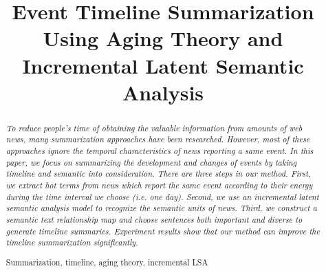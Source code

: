 \documentclass[runningheads,a4paper]{llncs}
\newcommand{\keywords}[1]{\par\addvspace\baselineskip
\noindent\keywordname\enspace\ignorespaces#1}
\begin{document}
\mainmatter  %

\title{Event Timeline Summarization Using Aging Theory and Incremental Latent Semantic Analysis}


%
%




%
%

\maketitle


\begin{abstract}
\emph{To reduce people’s time of obtaining the valuable information from amounts of web news, many summarization approaches have been researched. However, most of these approaches ignore the temporal characteristics of news reporting a same event. In this paper, we focus on summarizing the development and changes of events by taking timeline and semantic into consideration. There are three steps in our method. First, we extract hot terms from news which report the same event according to their energy during the time interval we choose (i.e. one day). Second, we use an incremental latent semantic analysis model to recognize the semantic units of news. Third, we construct a semantic text relationship map and choose sentences both important and diverse to generate timeline summaries. Experiment results show that our method can improve the timeline summarization significantly.}

\keywords{Summarization, timeline, aging theory, incremental LSA}
\end{abstract}
\end{document}
